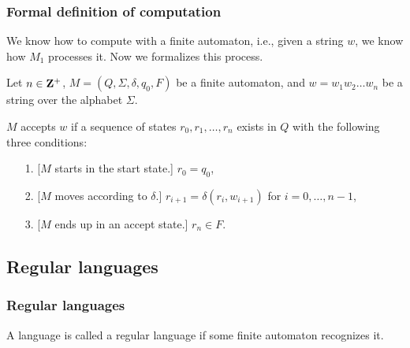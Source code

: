 \documentclass[xcolor=table]{beamer}
\begin{document}


\begin{frame}
  \frametitle{Formal definition of computation}
  
  We know how to \alert{compute} with a finite automaton, i.e., given a
  string $w$, we know how $M_1$ processes it.  Now we formalizes this
  process.

  \medskip
  Let $n\in \mathbf{Z}^+$, $M = (Q, \Sigma, \delta, q_0, F)$ be a finite
  automaton, and $w = w_1 w_2 \ldots w_n$ be a string over the
  alphabet $\Sigma$.

  \begin{Definition}
  \alert{$M$ accepts $w$} if a sequence of states $r_0, r_1, \ldots,
  r_n$ exists in $Q$ with the following three conditions:

  \begin{enumerate}
    \item[1.] [$M$ starts in the start state.] $r_0 = q_0$,
    \item[2.] [$M$ moves according to $\delta$.] $r_{i+1} = \delta(r_i, w_{i+1})$ for $i = 0,\ldots, n-1$,
    \item[3.] [$M$ ends up in an accept state.] $r_n \in F$.
  \end{enumerate}
  \end{Definition}

\end{frame}

\subsection[regular languages]{Regular languages}

\begin{frame}
  \frametitle{Regular languages}

  \begin{Definition}
    A language is called a \alert{regular language} if some finite
    automaton recognizes it.
  \end{Definition}
\end{frame}
\end{document}
